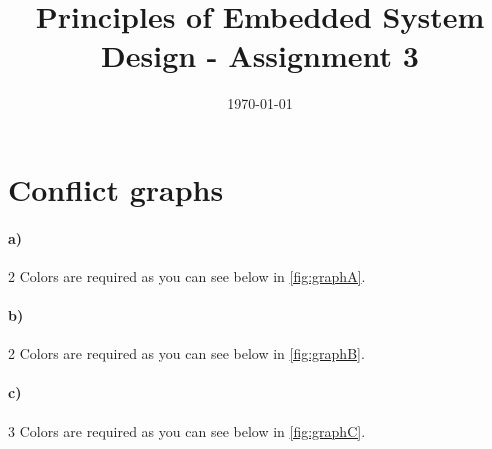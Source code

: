 \documentclass[a4paper,10pt]{scrartcl}
\title{Principles of Embedded System Design  - Assignment 3}
\author{\Authors}
\date{\today}
\begin{document}
\maketitle

\graphicspath{{img/}}

\section{Conflict graphs}

\paragraph{a)} 2 Colors are required as you can see below in \vref{fig:graphA}. 
\paragraph{b)} 2 Colors are required as you can see below in \vref{fig:graphB}.
\paragraph{c)} 3 Colors are required as you can see below in \vref{fig:graphC}.
	
\end{document}
